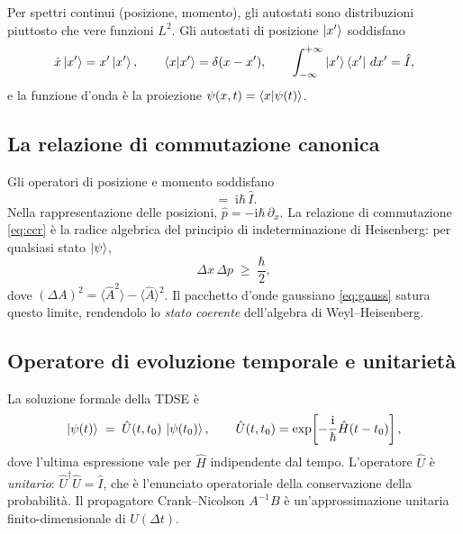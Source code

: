 \documentclass[12pt, a4paper]{article}
\newcommand{\dt}{\Delta t}
\newcommand{\ii}{\mathrm{i}}          %
\newcommand{\CN}{Crank--Nicolson}
\begin{document}
Per spettri continui (posizione, momento), gli autostati sono distribuzioni
piuttosto che vere funzioni $L^2$. Gli autostati di posizione $\ket{x'}$
soddisfano
\begin{equation}
  \hat{x}\ket{x'} = x'\ket{x'}, \qquad
  \braket{x}{x'} = \delta(x-x'), \qquad
  \int_{-\infty}^{+\infty} \ket{x'}\bra{x'}\,dx' = \hat{I},
\end{equation}
e la funzione d'onda è la proiezione
$\psi(x,t) = \braket{x}{\psi(t)}$.

\subsection{La relazione di commutazione canonica}

Gli operatori di posizione e momento soddisfano
\begin{equation}
  [\hat{x},\, \hat{p}] \;=\; \ii\hbar\,\hat{I}.
  \label{eq:ccr}
\end{equation}
Nella rappresentazione delle posizioni, $\hat{p} = -\ii\hbar\,\partial_x$.
La relazione di commutazione \eqref{eq:ccr} è la radice algebrica del
principio di indeterminazione di Heisenberg: per qualsiasi stato $\ket{\psi}$,
\begin{equation}
  \Delta x\,\Delta p \;\geq\; \frac{\hbar}{2},
\end{equation}
dove $(\Delta A)^2 = \langle \hat{A}^2\rangle - \langle\hat{A}\rangle^2$.
Il pacchetto d'onde gaussiano \eqref{eq:gauss} satura questo limite,
rendendolo lo \emph{stato coerente} dell'algebra di Weyl--Heisenberg.

\subsection{Operatore di evoluzione temporale e unitarietà}

La soluzione formale della TDSE è
\begin{equation}
  \ket{\psi(t)} \;=\; \hat{U}(t,t_0)\,\ket{\psi(t_0)},
  \qquad
  \hat{U}(t,t_0) = \exp\!\left[-\frac{\ii}{\hbar}\hat{H}(t-t_0)\right],
\end{equation}
dove l'ultima espressione vale per $\hat{H}$ indipendente dal tempo.
L'operatore $\hat{U}$ è \emph{unitario}: $\hat{U}^\dagger \hat{U} = \hat{I}$,
che è l'enunciato operatoriale della conservazione della probabilità.
Il propagatore \CN{} $A^{-1}B$ è un'approssimazione unitaria finito-dimensionale
di $\hat{U}(\dt)$.

\end{document}
